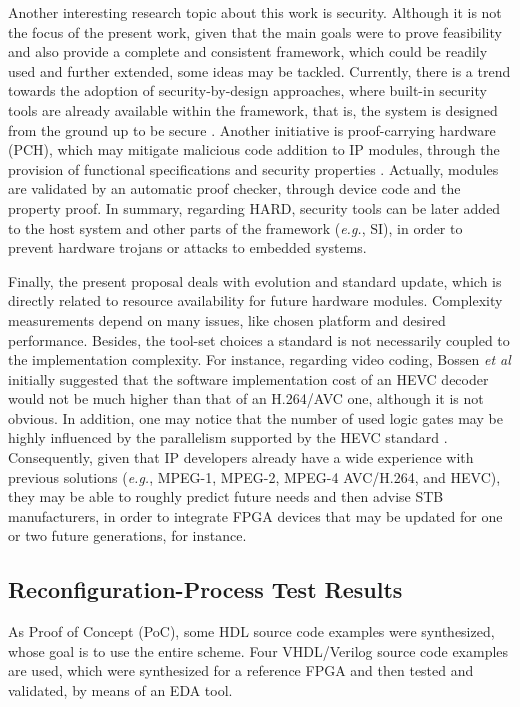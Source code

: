 Another interesting research topic about this work is security. Although it is not the focus of the present work, given that the main goals were to prove feasibility and also provide a complete and consistent framework, which could be readily used and further extended, some ideas may be tackled. Currently, there is a trend towards the adoption of security-by-design approaches, where built-in security tools are already available within the framework, that is, the system is designed from the ground up to be secure \cite{win8}. Another initiative is proof-carrying hardware (PCH), which may mitigate malicious code addition to IP modules, through the provision of functional specifications and security properties \cite{pch,pchmicro}. Actually, modules are validated by an automatic proof checker, through device code and the property proof. In summary, regarding HARD, security tools can be later added to the host system and other parts of the framework ({\it e.g.}, SI), in order to prevent hardware trojans or attacks to embedded systems.

Finally, the present proposal deals with evolution and standard update, which is directly related to resource availability for future hardware modules. Complexity measurements depend on many issues, like chosen platform and desired performance. Besides, the tool-set choices a standard is not necessarily coupled to the implementation complexity. For instance, regarding video coding, Bossen {\em et al} \cite{ref3} initially suggested that the software implementation cost of an HEVC decoder would not be much higher than that of an H.264/AVC one, although it is not obvious. In addition, one may notice that the number of used logic gates may be highly influenced by the parallelism supported by the HEVC standard \cite{hevc}. Consequently, given that IP developers already have a wide experience with previous solutions ({\it e.g.}, MPEG-1, MPEG-2, MPEG-4 AVC/H.264, and HEVC), they may be able to roughly predict future needs and then advise STB manufacturers, in order to integrate FPGA devices that may be updated for one or two future generations, for instance.


\subsection{Reconfiguration-Process Test Results}\label{reconfig-process}

As Proof of Concept (PoC), some HDL source code examples were synthesized, whose goal is to use the entire scheme. Four VHDL/Verilog source code examples are used, which were synthesized for a reference FPGA and then tested and validated, by means of an EDA tool.

